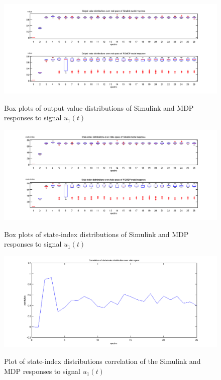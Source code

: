 \begin{figure}
\begin{center}
\includegraphics[width=18cm]{media/bw/bw_val_const_real_box}\\
\end{center}
\caption{Box plots of output value distributions of Simulink and MDP responses to signal $u_1(t)$}
\label{bw_val_const_real_box}
\end{figure}

\begin{figure}
\begin{center}
\includegraphics[width=18cm]{media/bw/bw_val_const_state_box}\\
\end{center}
\caption{Box plots of state-index distributions of Simulink and MDP responses to signal $u_1(t)$}
\label{bw_val_const_state_box}
\end{figure}

\begin{figure}
\begin{center}
\includegraphics[width=18cm]{media/bw/bw_val_const_state_corr}\\
\end{center}
\caption{Plot of state-index distributions correlation of the Simulink and MDP responses to signal $u_1(t)$}
\label{bw_val_const_state_corr}
\end{figure}

